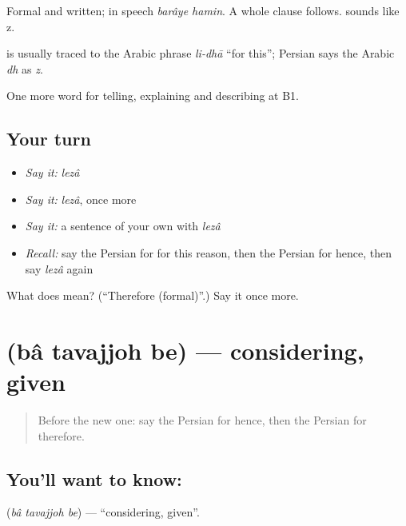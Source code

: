 Formal and written; in speech \emph{barâye hamin}. A whole clause follows.  sounds like z.

\begin{cousinweb}
\textbf{} is usually traced to the Arabic phrase \emph{li-dhā} \textquotedblleft{}for this\textquotedblright{}; Persian says the Arabic \emph{dh} as \emph{z}.
\end{cousinweb}

\begin{grammarlens}[title={What you've built}]
One more word for telling, explaining and describing at B1.
\end{grammarlens}

\subsection*{Your turn}
\begin{itemize}
\raggedright
  \item \emph{Say it:} \emph{lezâ}
  \item \emph{Say it:} \emph{lezâ}, once more
  \item \emph{Say it:} a sentence of your own with \emph{lezâ}
  \item \emph{Recall:} say the Persian for for this reason, then the Persian for hence, then say \emph{lezâ} again
\end{itemize}

\begin{tcolorbox}[breakable,colback=teal!4,colframe=teal!35!black,title={Before you move on}]
What does  mean? (\textquotedblleft{}Therefore (formal)\textquotedblright{}.) Say it once more.
\end{tcolorbox}
\section[\texorpdfstring{\fa{با} \fa{توجه} \fa{به} (bâ tavajjoh be)}{با توجه به (bâ tavajjoh be)}]{   (bâ tavajjoh be) — considering, given}

\label{lesson:FA-C371-ba-tavajjoh-be}



\begin{quote}
Before the new one: say the Persian for hence, then the Persian for therefore.
\end{quote}

\subsection*{You'll want to know:   }
\textbf{  } (\emph{bâ tavajjoh be}) — \textquotedblleft{}considering, given\textquotedblright{}.

